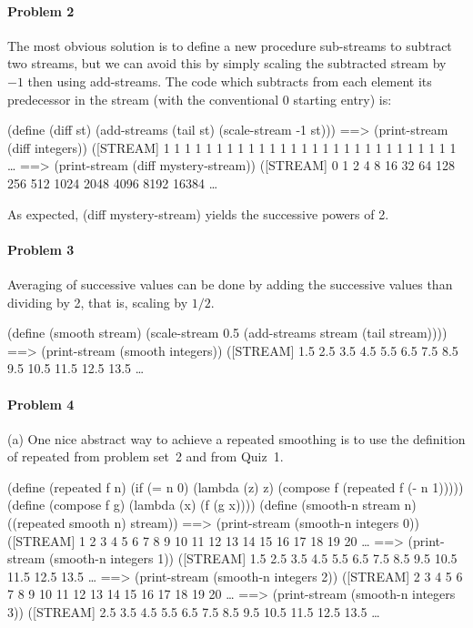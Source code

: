 \paragraph{Problem 2}

The most obvious solution is to define a new procedure {\cf sub-streams} to
subtract two streams, but we can avoid this by simply scaling the subtracted
stream by $-1$ then using {\cf add-streams}.  The code which subtracts from
each element its predecessor in the stream (with the conventional 0 starting
entry) is:

\beginlisp
(define (diff st)
  (add-streams (tail st)
               (scale-stream -1 st)))
\null
==> (print-stream (diff integers))
([STREAM] 1 1 1 1 1 1 1 1 1 1 1 1 1 1 1 1 1 1 1 1 1 1 1 1 1 1 1 1 \ldots
\null
==> (print-stream (diff mystery-stream))
([STREAM] 0 1 2 4 8 16 32 64 128 256 512 1024 2048 4096 8192 16384 \ldots
\endlisp

As expected, {\cf (diff mystery-stream)} yields the successive powers of 2.

\newpage

\paragraph{Problem 3}

Averaging of successive values can be done by adding the successive values than
dividing by 2, that is, scaling by $1/2$.

\beginlisp
(define (smooth stream)
  (scale-stream 0.5 (add-streams stream (tail stream))))
\null
==> (print-stream (smooth integers))
([STREAM] 1.5 2.5 3.5 4.5 5.5 6.5 7.5 8.5 9.5 10.5 11.5 12.5 13.5 \ldots
\endlisp

\paragraph{Problem 4}

\mbox{} %

(a) One nice abstract way to achieve a repeated smoothing is to use the
definition of {\cf repeated} from problem set~2 and from Quiz~1.

\beginlisp
(define (repeated f n)
  (if (= n 0)
      (lambda (z) z)
      (compose f (repeated f (- n 1)))))
\null
(define (compose f g)
  (lambda (x) (f (g x))))
\null
(define (smooth-n stream n)
  ((repeated smooth n) stream))
\null
==> (print-stream (smooth-n integers 0))
([STREAM] 1 2 3 4 5 6 7 8 9 10 11 12 13 14 15 16 17 18 19 20 \ldots
==> (print-stream (smooth-n integers 1))
([STREAM] 1.5 2.5 3.5 4.5 5.5 6.5 7.5 8.5 9.5 10.5 11.5 12.5 13.5 \ldots
==> (print-stream (smooth-n integers 2))
([STREAM] 2 3 4 5 6 7 8 9 10 11 12 13 14 15 16 17 18 19 20 \ldots
==> (print-stream (smooth-n integers 3))
([STREAM] 2.5 3.5 4.5 5.5 6.5 7.5 8.5 9.5 10.5 11.5 12.5 13.5 \ldots
\endlisp

